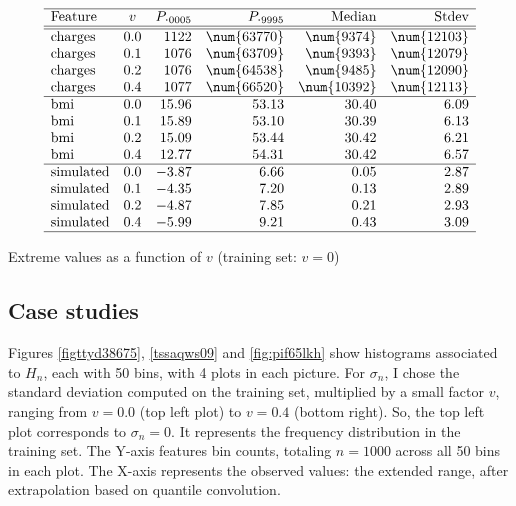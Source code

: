 \documentclass[oneside,10pt]{book}
\renewcommand{\arraystretch}{1.4} %
\begin{document}
\renewcommand{\arraystretch}{1.0} %
\renewcommand{\arraystretch}{1.2} %
\begin{table}[H]
\small
\[
\begin{array}{lcrrrr}
\hline
\text{Feature}  &v  & P._{0005} & P._{9995} & \text{Median} & \text{Stdev} \\
\hline
\hline
\text{charges} & 0.0 & 1122 & \num{63770} &  \num{9374} & \num{12103}\\
\text{charges} & 0.1 & 1076 & \num{63709} &  \num{9393}  & \num{12079} \\
\text{charges} & 0.2 & 1076 & \num{64538} &  \num{9485}  &  \num{12090}\\
\text{charges} & 0. 4& 1077 & \num{66520} & \num{10392}  & \num{12113}\\
\hline
\text{bmi} & 0.0  &  15.96 &53.13 &30.40 & 6.09 \\
\text{bmi} & 0.1 & 15.89 & 53.10 & 30.39 & 6.13 \\
\text{bmi} & 0.2  & 15.09 &53.44 &30.42 & 6.21 \\
\text{bmi} & 0.4  & 12.77 & 54.31&30.42&6.57\\
\hline
\text{simulated} & 0.0  &  -3.87& 6.66& 0.05&2.87\\
\text{simulated} & 0.1  & -4.35& 7.20& 0.13&2.89\\
\text{simulated} & 0.2  &  -4.87&7.85& 0.21&2.93\\
\text{simulated} & 0.4  & -5.99& 9.21& 0.43&3.09\\
\hline
\end{array}
\]
\caption{\label{widthprtz09} Extreme values as a function of $v$ (training set: $v=0$)}
\end{table}
\renewcommand{\arraystretch}{1.0} %




\subsection{Case studies} \label{cscsder}

Figures \ref{figttyd38675}, \ref{tssaqws09} and \ref{fig:pif65lkh} show histograms associated to $H_n$, each with 50 bins, with 4 plots in each picture.
 For $\sigma_n$, I chose the standard deviation computed on the training set, multiplied
 by a small factor $v$, ranging from $v=0.0$ (top left plot) to $v=0.4$ (bottom right). 
So, the top left plot corresponds to $\sigma_n=0$. It represents the frequency distribution in the training set. The Y-axis features bin counts, totaling $n=1000$ across all 50 bins in each plot. The X-axis represents  the
 observed values: the extended range, after extrapolation based on quantile convolution.
\end{document}
